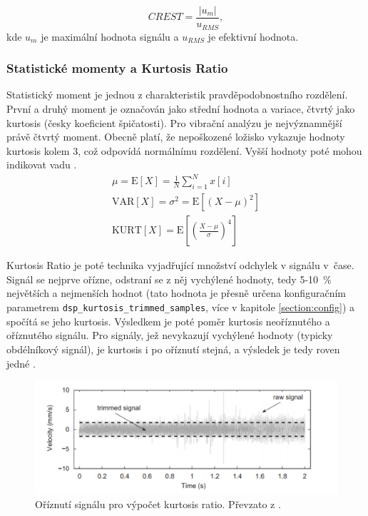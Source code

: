         \begin{equation}
            CREST = \frac{|u_m|}{u_{RMS}}, 
        \end{equation}
        kde $u_m$ je maximální hodnota signálu a $u_{RMS}$ je efektivní hodnota.
  

    \subsubsection{Statistické momenty a Kurtosis Ratio}
    \label{section:kurtosis}
        Statistický moment je jednou z charakteristik pravděpodobnostního rozdělení. První a druhý moment je označován jako střední hodnota a variace, čtvrtý jako kurtosis (česky koeficient špičatosti). Pro vibrační analýzu je nejvýznamnější právě čtvrtý moment. Obecně platí, že nepoškozené ložisko vykazuje hodnoty kurtosis kolem 3, což odpovídá normálnímu rozdělení. Vyšší hodnoty poté mohou indikovat vadu \cite{book:2}.
        \begin{align}
            \mu = \text{E}\left[X\right] = \frac{1}{N}\sum_{i=1}^{N} x[i]\\
            \text{VAR}\left[X\right] = \sigma^2 = \text{E}\left[\left(X - \mu\right)^2\right]\\
            \text{KURT}\left[X\right] = \text{E}\left[\left(\frac{X - \mu}{\sigma}\right)^4\right]
        \end{align}
        
        Kurtosis Ratio je poté technika vyjadřující množství odchylek v signálu v~čase.
        Signál se nejprve ořízne, odstraní se z něj vychýlené hodnoty, tedy 5-10~\% největších a nejmenších hodnot (tato hodnota je přesně určena konfiguračním parametrem \texttt{dsp\_kurtosis\_trimmed\_samples}, více v kapitole \ref{section:config}) a spočítá se jeho kurtosis. Výsledkem je poté poměr kurtosis neoříznutého a oříznutého signálu. Pro signály, jež nevykazují vychýlené hodnoty (typicky obdélníkový signál), je kurtosis i po oříznutí stejná, a výsledek je tedy roven jedné \cite{article:2}.
        
        \begin{figure} [!h]
            \centering
            \caption{Oříznutí signálu pro výpočet kurtosis ratio. Převzato z \cite{article:2}.}
            \includegraphics[width=\textwidth]{DSP/Figs/kurtosis_ratio.png}
        \end{figure} 
        
